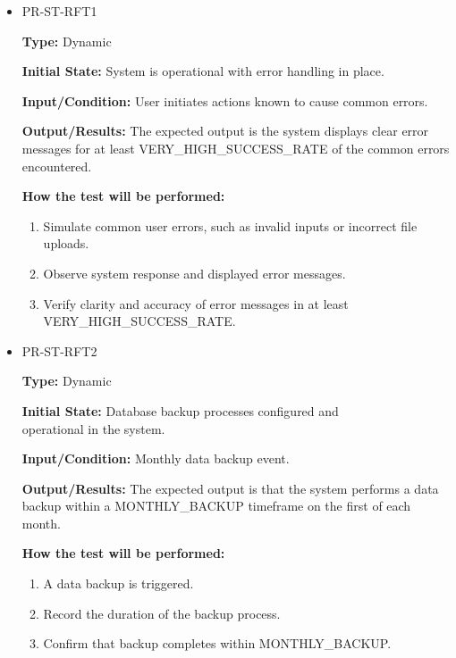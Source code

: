 \documentclass[12pt, titlepage]{article}
\begin{document}
\begin{itemize}
  \item PR-ST-RFT1
  \begin{mdframed}[linewidth=0.5mm]
      \textbf{Type:} Dynamic \par
      \textbf{Initial State:} System is operational with error handling in place. \par
      \textbf{Input/Condition:} User initiates actions known to cause common errors. \par
      \textbf{Output/Results:} The expected output is the system displays clear error messages for at least VERY\_HIGH\_SUCCESS\_RATE of the common errors encountered. \par
      \textbf{How the test will be performed:}
      \begin{enumerate}[noitemsep]
        \item Simulate common user errors, such as invalid inputs or incorrect file uploads.
        \item Observe system response and displayed error messages.
        \item Verify clarity and accuracy of error messages in at least \\VERY\_HIGH\_SUCCESS\_RATE.
      \end{enumerate}
  \end{mdframed}
  \item PR-ST-RFT2
  \begin{mdframed}[linewidth=0.5mm]
      \textbf{Type:} Dynamic \par
      \textbf{Initial State:} Database backup processes configured and \\operational in the system. \par
      \textbf{Input/Condition:} Monthly data backup event. \par
      \textbf{Output/Results:} The expected output is that the system performs a data backup within a MONTHLY\_BACKUP timeframe on the first of each month. \par
      \textbf{How the test will be performed:}
      \begin{enumerate}[noitemsep]
        \item A data backup is triggered.
        \item Record the duration of the backup process.
        \item Confirm that backup completes within MONTHLY\_BACKUP.
      \end{enumerate}
  \end{mdframed}
\end{itemize}
\end{document}
